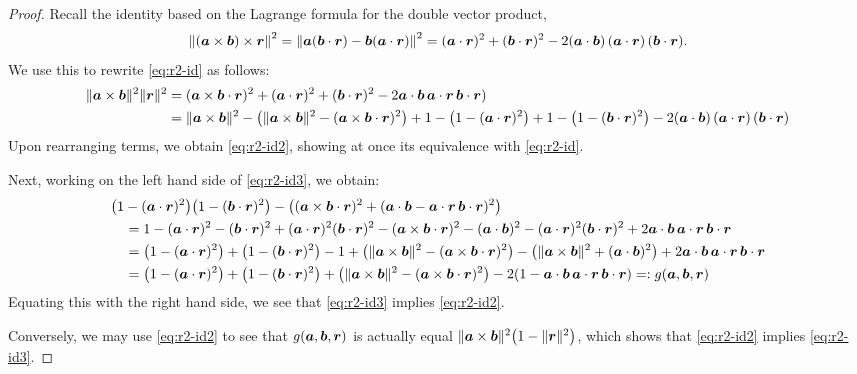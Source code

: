 \begin{proof}
Recall the identity based on the Lagrange formula for the double vector product,
  \begin{align}
    \left\|(\boa\times\bob)\times\bor\right\|^2 = \left\|\boa(\bob\cdot\bor) - \bob(\boa\cdot\bor) \right\|^2%
    = (\boa\cdot\bor)^2 + (\bob\cdot\bor)^2 - 2(\boa\cdot\bob)\,(\boa\cdot\bor)\,(\bob\cdot\bor).
  \end{align}
  We use this to rewrite \eqref{eq:r2-id} as follows:
  \begin{align*}
    \|\bm{a}\times\bm{b}\|^2\|\bm{r}\|^2&=(\bm{a}\times\bm{b}\cdot\bm{r})^2+(\bm{a}\cdot\bm{r})^2 + (\bm{b}\cdot\bm{r})^2 - 2\bm{a}\cdot\bm{b}\,\bm{a}\cdot\bm{r}\,\bm{b}\cdot\bm{r})\\
                                  &=\|\bm{a}\times\bm{b}\|^2-\left(\|\bm{a}\times\bm{b}\|^2-(\bm{a}\times\bm{b}\cdot\bm{r})^2\right)+1-\left(1-(\bm{a}\cdot\bm{r})^2\right)+1-\left(1-(\bm{b}\cdot\bm{r})^2\right)-2 (\bm{a}\cdot\bm{b})\,(\bm{a}\cdot\bm{r})\,(\bm{b}\cdot\bm{r})                                    
  \end{align*}
  Upon rearranging terms, we obtain \eqref{eq:r2-id2}, showing at once its equivalence with \eqref{eq:r2-id}.
  
  Next, working on the left hand side of \eqref{eq:r2-id3}, we obtain:
 \begin{align}
 &\bigl(1-(\bm{a}\cdot\bm{r})^2\bigr)\bigl(1-(\bm{b}\cdot\bm{r})^2\bigr)-
    \left((\bm{a}\times\bm{b}\cdot\bm{r})^2+(\bm{a}\cdot\bm{b}-\bm{a}\cdot\bm{r}\,\bm{b}\cdot\bm{r})^2\right)\\
    &\quad=1-(\bm{a}\cdot\bm{r})^2-(\bm{b}\cdot\bm{r})^2+(\bm{a}\cdot\bm{r})^2(\bm{b}\cdot\bm{r})^2-(\bm{a}\times\bm{b}\cdot\bm{r})^2-(\bm{a}\cdot\bm{b})^2-(\bm{a}\cdot\bm{r})^2(\bm{b}\cdot\bm{r})^2
    +2\bm{a}\cdot\bm{b}\,\bm{a}\cdot\bm{r}\,\bm{b}\cdot\bm{r}\\
    &\quad=\left(1-(\bm{a}\cdot\bm{r})^2\right)+\left(1-(\bm{b}\cdot\bm{r})^2\right)-1+\left(\|\bm{a}\times\bm{b}\|^2-(\bm{a}\times\bm{b}\cdot\bm{r})^2\right)-\left(\|\bm{a}\times\bm{b}\|^2+(\bm{a}\cdot\bm{b})^2\right)
    +2\bm{a}\cdot\bm{b}\,\bm{a}\cdot\bm{r}\,\bm{b}\cdot\bm{r}\\
    &\quad=\left(1-(\bm{a}\cdot\bm{r})^2\right)+\left(1-(\bm{b}\cdot\bm{r})^2\right)+\left(\|\bm{a}\times\bm{b}\|^2-(\bm{a}\times\bm{b}\cdot\bm{r})^2\right)-2(1-\bm{a}\cdot\bm{b}\,\bm{a}\cdot\bm{r}\,\bm{b}\cdot\bm{r})=: g(\bm{a},\bm{b},\bm{r})
 \end{align}
 Equating this with the right hand side, we see that \eqref{eq:r2-id3} implies \eqref{eq:r2-id2}.
 
 Conversely, we may use \eqref{eq:r2-id2} to see that $g(\bm{a},\bm{b},\bm{r})$ is actually equal $\|\bm{a}\times\bm{b}\|^2\bigl(1-\|\bm{r}\|^2\bigr)$, which shows that \eqref{eq:r2-id2} implies
 \eqref{eq:r2-id3}.
\end{proof}
